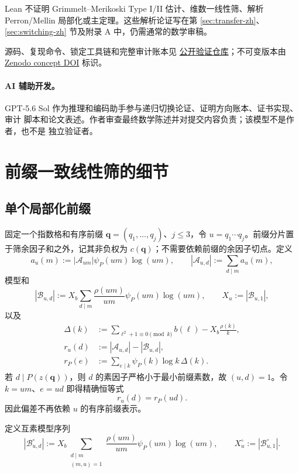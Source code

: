 \documentclass[UTF8,10pt,a4paper]{ctexart}
\newcommand{\Acal}{\mathcal{A}}
\newcommand{\Bcal}{\mathcal{B}}
\newcommand{\1}{\mathbf{1}}
\theoremstyle{remark}
\begin{document}
Lean 不证明 Grimmelt--Merikoski Type I/II 估计、维数一线性筛、解析
Perron/Mellin 局部化或主定理。这些解析论证写在第
\ref{sec:transfer-zh}、\ref{sec:switching-zh} 节及附录 A 中，仍需通常的数学审稿。

源码、复现命令、锁定工具链和完整审计账本见
\href{https://github.com/CGandGameEngineLearner/landau-fourth-problem-1.323}
{公开验证仓库}；不可变版本由
\href{https://doi.org/10.5281/zenodo.22140874}{Zenodo concept DOI} 标识。

\paragraph{AI 辅助开发。}
GPT-5.6 Sol 作为推理和编码助手参与递归切换论证、证明方向账本、证书实现、审计
脚本和论文表述。作者审查最终数学陈述并对提交内容负责；该模型不是作者，也不是
独立验证者。

\appendix
\section{前缀一致线性筛的细节}\label{app:prefix-sieve-zh}

\subsection{单个局部化前缀}
固定一个指数格和有序前缀 $\boldsymbol q=(q_1,\ldots,q_j)$、$j\le3$，令
$u=q_1\cdots q_j$。前缀分片置于筛余因子和之外，记其非负权为
$c(\boldsymbol q)$；不需要依赖前缀的余因子切点。定义
\[
 a_u(m):=|\Acal_{um}|\psi_P(um)\log(um),\qquad
 |\Acal_{u,d}|:=\sum_{d\mid m}a_u(m),
\]
模型和
\[
 |\Bcal_{u,d}|:=
 X_b\sum_{d\mid m}\frac{\rho(um)}{um}
 \psi_P(um)\log(um),\qquad X_u:=|\Bcal_{u,1}|,
\]
以及
\[
\begin{aligned}
 \Delta(k)&:=\sum_{\ell^2+1\equiv0\pmod k}b(\ell)
              -X_b\frac{\rho(k)}k,\\
 r_u(d)&:=|\Acal_{u,d}|-|\Bcal_{u,d}|,\\
 r_P(e)&:=\sum_{e\mid k}\psi_P(k)\log k\,\Delta(k).
\end{aligned}
\]
若 $d\mid P(z(\boldsymbol q))$，则 $d$ 的素因子严格小于最小前缀素数，故
$(u,d)=1$。令 $k=um$、$e=ud$ 即得精确恒等式
\begin{equation}\label{eq:prefix-common-discrepancy-zh}
 r_u(d)=r_P(ud).
\end{equation}
因此偏差不再依赖 $u$ 的有序前缀表示。

定义互素模型序列
\[
 |\Bcal_{u,d}^{\circ}|:=X_b
 \sum_{\substack{d\mid m\\(m,u)=1}}
 \frac{\rho(um)}{um}\psi_P(um)\log(um),\qquad
 X_u^{\circ}:=|\Bcal_{u,1}^{\circ}|.
\]
\end{document}
